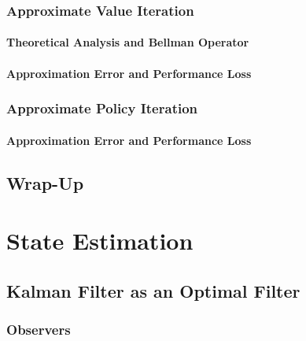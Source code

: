 		\subsection{Approximate Value Iteration} %

			\subsubsection{Theoretical Analysis and Bellman Operator} %

			\subsubsection{Approximation Error and Performance Loss} %

		\subsection{Approximate Policy Iteration} %

			\subsubsection{Approximation Error and Performance Loss} %

	\section{Wrap-Up} %

\chapter{State Estimation} %
	\label{c:stateEstimation}


	\section{Kalman Filter as an Optimal Filter} %

		\subsection{Observers} %

